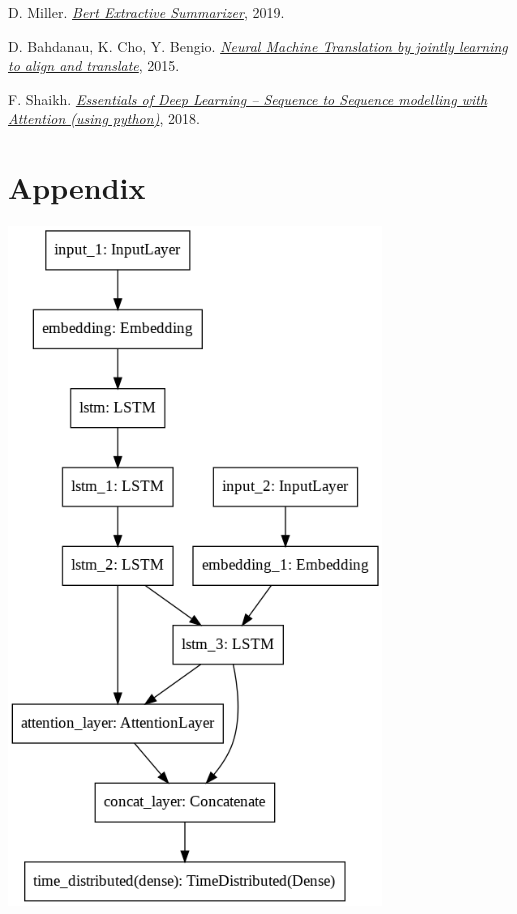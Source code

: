 \documentclass[fleqn,10pt]{SelfArx} %
\begin{document}
\begin{thebibliography}{9}
D. Miller. 
\textit{\href{https://pypi.org/project/bert-extractive-summarizer/}{Bert Extractive Summarizer}}, 2019.

D. Bahdanau, K. Cho, Y. Bengio. 
\textit{\href{https://arxiv.org/pdf/1409.0473.pdf}{Neural Machine Translation by jointly learning to align and translate}}, 2015.

F. Shaikh. 
\textit{\href{https://www.analyticsvidhya.com/blog/2018/03/essentials-of-deep-learning-sequence-to-sequence-modelling-with-attention-part-i/?utm_source=blog&utm_medium=comprehensive-guide-text-summarization-using-deep-learning-python}{Essentials of Deep Learning – Sequence to Sequence modelling with Attention (using python)}}, 2018.
\end{thebibliography}
\clearpage
\onecolumn
\section*{Appendix}
\par
{\centering\vspace{10pt}
\includegraphics[height=18cm]{model.png}
\vspace{10pt}
\par}
\end{document}
